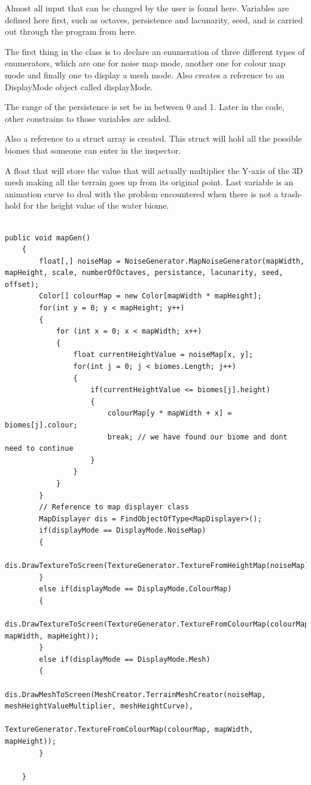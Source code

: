 \documentclass[a4paper,12pt]{book}
\begin{document}
Almost all input that can be changed by the user is found here. Variables are defined here first, such as octaves, persistence and lacunarity, seed, and is carried out through the program from here.

The first thing in the class is to declare an enumeration of three different types of enumerators, which are one for noise map mode, another one for colour map mode and finally one to display a mesh mode. Also creates a reference to an DisplayMode object called displayMode.

The range of the persistence is set be in between 0 and 1. Later in the code, other constrains to those variables are added.

Also a reference to a struct array is created. This struct will hold all the possible biomes that someone can enter in the inspector.

A float that will store the value that will actually multiplier the Y-axis of the 3D mesh making all the terrain goes up from its original point.
Last variable is an animation curve to deal with the problem encountered when there is not a trash-hold for the height value of the water biome.

\begin{lstlisting}

public void mapGen()
    {
        float[,] noiseMap = NoiseGenerator.MapNoiseGenerator(mapWidth, mapHeight, scale, numberOfOctaves, persistance, lacunarity, seed, offset);
        Color[] colourMap = new Color[mapWidth * mapHeight];
        for(int y = 0; y < mapHeight; y++)
        {
            for (int x = 0; x < mapWidth; x++)
            {
                float currentHeightValue = noiseMap[x, y];
                for(int j = 0; j < biomes.Length; j++)
                {
                    if(currentHeightValue <= biomes[j].height)
                    {
                        colourMap[y * mapWidth + x] = biomes[j].colour;
                        break; // we have found our biome and dont need to continue
                    }
                } 
            }
        }
        // Reference to map displayer class
        MapDisplayer dis = FindObjectOfType<MapDisplayer>();
        if(displayMode == DisplayMode.NoiseMap)
        {
            dis.DrawTextureToScreen(TextureGenerator.TextureFromHeightMap(noiseMap));
        }
        else if(displayMode == DisplayMode.ColourMap)
        {
            dis.DrawTextureToScreen(TextureGenerator.TextureFromColourMap(colourMap, mapWidth, mapHeight));
        }
        else if(displayMode == DisplayMode.Mesh)
        {
            dis.DrawMeshToScreen(MeshCreator.TerrainMeshCreator(noiseMap, meshHeightValueMultiplier, meshHeightCurve), 
                                                TextureGenerator.TextureFromColourMap(colourMap, mapWidth, mapHeight));
        }
        
    }

\end{lstlisting}
\end{document}
